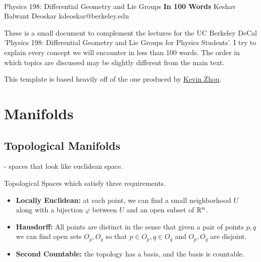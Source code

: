 \documentclass[11pt]{article}
\begin{document}
\thispagestyle{empty}
\bigskip \
\vspace{0.1cm}

\begin{center}
{\fontsize{22}{22} \selectfont Physics 198: Differential Geometry and Lie Groups}
\vskip 16pt
{\fontsize{36}{36} \selectfont \bf \sffamily In 100 Words}
\vskip 24pt
{\fontsize{18}{18} \selectfont \rmfamily Keshav Balwant Deoskar} 
\vskip 6pt
{\fontsize{14}{14} \selectfont \ttfamily kdeoskar@berkeley.edu} 
\vskip 24pt
\end{center}



These is a small document to complement the lectures for the UC Berkeley DeCal 'Physics 198: Differential Geometry and Lie Groups for Physics Students'. I try to explain every concept we will encounter in less than 100 words. The order in which topics are discussed may be slightly different from the main text.


\vskip 0.5cm
This template is based heavily off of the one produced by \href{https://knzhou.github.io/}{Kevin Zhou}.

\tableofcontents 


\newpage
\section{Manifolds}

\vskip 0.5cm
\subsection{Topological Manifolds} - spaces that look like euclidean space.
\begin{redbox}

  Topological Spaces which satisfy three requirements. 
  \begin{itemize}
    \item \textbf{Locally Euclidean:} at each point, we can find a small neighborhood $U$ along with a bijection $\varphi$ between $U$ and an open subset of $\mathbb{R}^n$.
    \item \textbf{Hausdorff:} All points are distinct in the sense that given a pair of points $p, q$ we can find open sets $O_p, O_q$ so that $p \in O_p, q \in O_q$ and $O_p, O_q$ are disjoint.
    \item \textbf{Second Countable:} the topology has a basis, and the basis is countable.
  \end{itemize}

\end{redbox}
\end{document}
